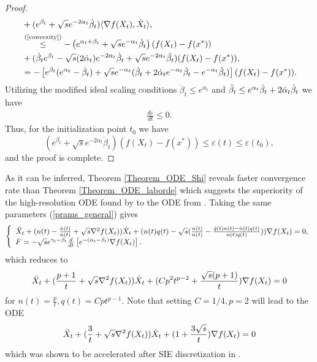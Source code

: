 \documentclass{article}
\theoremstyle{plain}
\theoremstyle{definition}
\theoremstyle{remark}
\begin{document}
\begin{proof}
\begin{align}
    &+(e^{\beta_t}+\sqrt{s}e^{-2\alpha_t}\dot \beta_t)\langle\nabla f(X_t),\dot X_t\rangle,\nonumber\\
     & \overset{\text{(\ref{convexity}})}{\leq} -\left(e^{\alpha_t+\beta_t}+\sqrt{s}e^{-\alpha_t}\dot \beta_t \right)(f(X_t)-f(x^*))\nonumber\\
     &+(\dot \beta_te^{\beta_t}-\sqrt{s}(2\dot \alpha_t)e^{-2\alpha_t}\dot \beta_t +\sqrt{s}e^{-2\alpha_t}\Ddot{\beta_t})(f(X_t)-f(x^*)),\nonumber\\
     & = -\left[e^{\beta_t}(e^{\alpha_t}-\dot \beta_t)+\sqrt{s}e^{-\alpha_t}(\dot \beta_t+2\dot \alpha_t e^{-\alpha_t}\dot \beta_t-e^{-\alpha_t}\Ddot{\beta}_t)\right](f(X_t)-f(x^*)).\nonumber
\end{align}
Utilizing the modified ideal scaling conditions $\dot \beta_t\leq e^{\alpha_t}$ and $\Ddot{\beta}_t\leq e^{\alpha_t}\dot \beta_t + 2\dot \alpha_t \dot \beta_t$ we have
\begin{align}
     \frac{d \varepsilon}{dt}\leq 0.\nonumber
\end{align}
Thus, for the initialization point $t_0$ we have
$$(e^{\beta_t}+\sqrt{s}e^{-2\alpha_t}\dot \beta_t)(f(X_t)-f(x^*))\leq \varepsilon(t)\leq \varepsilon(t_0),$$
and the proof is complete.
\end{proof}
As it can be inferred, Theorem \ref{Theorem_ODE_Shi} reveals faster convergence rate than Theorem \ref{Theorem_ODE_laborde} which suggests the superiority of the high-resolution ODE found by \cite{Shi2021UnderstandingTA} to the ODE from \cite{pmlr-v108-laborde20a}. Taking the same parameters (\ref{prams_general}) gives
 \begin{align}\label{HR_cnts_general_npq_SHI}
\left\{
\begin{array}{l}
     \Ddot{X}_t + (n(t)-\frac{\dot n(t)}{n(t)}+\sqrt{s}\nabla^2 f(X_t))\dot{X}_t+(n(t)q(t)-\sqrt{s} (\frac{\dot n(t)}{n(t)}-\frac{\dot q(t)n(t)-\dot n(t)q(t)}{n(t)q(t)}))\nabla f(X_t)=0,   \\
     F = -\sqrt{s}e^{\gamma_t-\beta_t}\frac{d}{dt}\left[e^{-(\alpha_t-\beta_t)}\nabla f(X_t)\right]. 
\end{array}\right.
\end{align}
which reduces to
\begin{align}\label{HR_cnts_general_npq_p}
     \Ddot{X}_t + (\frac{p+1}{t}+\sqrt{s}\nabla^2 f(X_t))\dot{X}_t+(Cp^2t^{p-2}+\frac{\sqrt{s}(p+1)}{t})\nabla f(X_t)=0
\end{align}
for $n(t)=\frac{p}{t},q(t)=Cpt^{p-1}$. Note that setting $C=1/4,p=2$ will lead to the ODE 
\begin{align}\label{HR_cnts_general_stable_ODE}
     \Ddot{X}_t + (\frac{3}{t}+\sqrt{s}\nabla^2 f(X_t))\dot{X}_t+(1+\frac{3\sqrt{s}}{t})\nabla f(X_t)=0
\end{align}
which was shown to be accelerated after SIE discretization in \cite{shi2019acceleration}.
\end{document}
